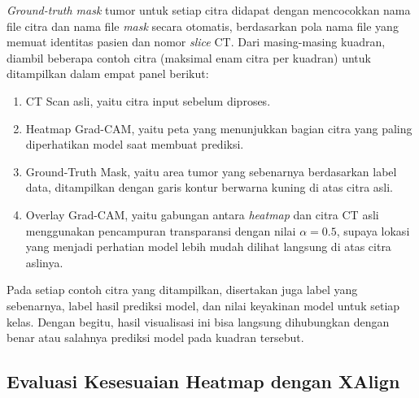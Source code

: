 \textit{Ground-truth mask} tumor untuk setiap citra didapat dengan mencocokkan nama file citra dan nama file \textit{mask} secara otomatis, berdasarkan pola nama file yang memuat identitas pasien dan nomor \textit{slice} CT. Dari masing-masing kuadran, diambil beberapa contoh citra (maksimal enam citra per kuadran) untuk ditampilkan dalam empat panel berikut:
\begin{enumerate}
	\item CT Scan asli, yaitu citra input sebelum diproses.
	\item Heatmap Grad-CAM, yaitu peta yang menunjukkan bagian citra yang paling diperhatikan model saat membuat prediksi.
	\item Ground-Truth Mask, yaitu area tumor yang sebenarnya berdasarkan label data, ditampilkan dengan garis kontur berwarna kuning di atas citra asli.
	\item Overlay Grad-CAM, yaitu gabungan antara \textit{heatmap} dan citra CT asli menggunakan pencampuran transparansi dengan nilai $\alpha = 0.5$, supaya lokasi yang menjadi perhatian model lebih mudah dilihat langsung di atas citra aslinya.
\end{enumerate}
Pada setiap contoh citra yang ditampilkan, disertakan juga label yang sebenarnya, label hasil prediksi model, dan nilai keyakinan model untuk setiap kelas. Dengan begitu, hasil visualisasi ini bisa langsung dihubungkan dengan benar atau salahnya prediksi model pada kuadran tersebut.

\subsection{Evaluasi Kesesuaian Heatmap dengan XAlign}

